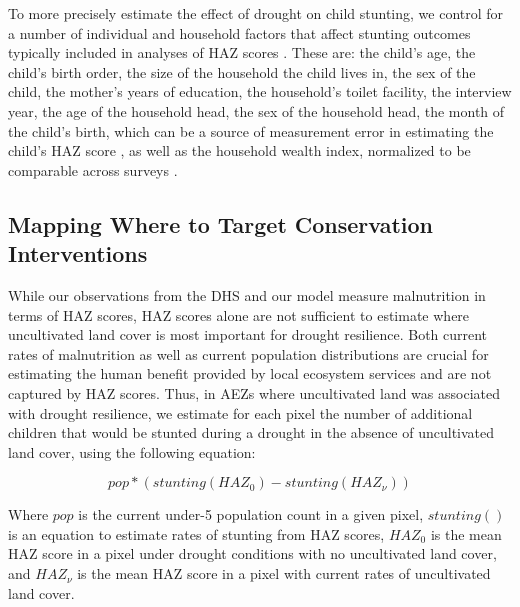 \documentclass{article}
\begin{document}
To more precisely estimate the effect of drought on child stunting, we control for a number of individual and household factors that affect stunting outcomes typically included in analyses of HAZ scores \cite{brown2020empirical}.  These are: the child's age, the child's birth order, the size of the household the child lives in, the sex of the child, the mother's years of education, the household's toilet facility, the interview year, the age of the household head, the sex of the household head, the month of the child's birth, which can be a source of measurement error in estimating the child's HAZ score \cite{larsen2019misreporting}, as well as the household wealth index, normalized to be comparable across surveys \cite{Rutstein2014c}.

\subsection{Mapping Where to Target Conservation Interventions}
While our observations from the DHS and our model measure malnutrition in terms of HAZ scores, HAZ scores alone are not sufficient to estimate where uncultivated land cover is most important for drought resilience.  Both current rates of malnutrition as well as current population distributions are crucial for estimating the human benefit provided by local ecosystem services and are not captured by HAZ scores.  Thus, in AEZs where uncultivated land was associated with drought resilience, we estimate for each pixel the number of additional children that would be stunted during a drought in the absence of uncultivated land cover, using the following equation:

\begin{equation}
  pop * (stunting(HAZ_{0}) - stunting(HAZ_{\nu})) \label{eqn:stunting}
\end{equation}

Where $pop$ is the current under-5 population count in a given pixel, $stunting()$ is an equation to estimate rates of stunting from HAZ scores, $HAZ_{0}$ is the mean HAZ score in a pixel under drought conditions with no uncultivated land cover, and $HAZ_{\nu}$ is the mean HAZ score in a pixel with current rates of uncultivated land cover.
\end{document}
